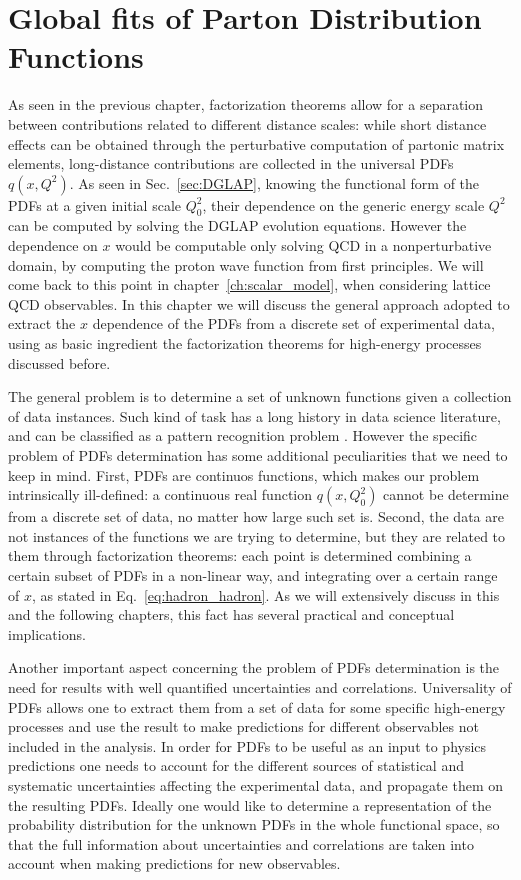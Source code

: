 \chapter{Global fits of Parton Distribution Functions} 
\label{ch:nnpdf_methodology}
As seen in the previous chapter, factorization theorems allow for a separation between contributions 
related to different distance scales: while short distance
effects can be obtained through the perturbative computation of partonic matrix elements, 
long-distance contributions are collected in the universal PDFs $q\left(x,Q^2\right)$. As seen in Sec.~\ref{sec:DGLAP},
knowing the functional form of the PDFs at a given initial scale $Q_0^2$, 
their dependence on the generic energy scale $Q^2$ can be computed by solving the DGLAP evolution equations.
However the dependence on $x$ would be computable only solving QCD in a nonperturbative domain, 
by computing the proton wave function from first principles. We will come back to 
this point in chapter~\ref{ch:scalar_model}, when considering lattice QCD observables.
In this chapter we will discuss the general approach adopted to extract the $x$ dependence of the PDFs
from a discrete set of experimental data, using as basic ingredient the factorization theorems for high-energy processes
discussed before.

%
The general problem is to determine a set of unknown functions given
a collection of data instances. Such kind of task has a long history in data science literature, 
and can be classified as a pattern recognition problem \cite{Forte:2020yip}.
However the specific problem of PDFs determination has some additional peculiarities that we need to keep in mind.
First, PDFs are continuos functions, which makes our problem intrinsically ill-defined: a continuous real function
$q\left(x,Q_0^2\right)$ cannot be determine from a discrete set of data, no matter how large such set is.
Second, the data are not instances of the functions we are trying to determine, but they are related to 
them through factorization theorems: each point is determined combining a certain subset of PDFs in a non-linear way,
and integrating over a certain range of $x$, as stated in Eq.~\eqref{eq:hadron_hadron}. 
As we will extensively discuss in this and the following chapters,
this fact has several practical and conceptual implications.

%
Another important aspect concerning the problem of PDFs determination 
is the need for results with well quantified uncertainties and correlations.
Universality of PDFs allows one to extract them from a set of data for some specific high-energy processes
and use the result to make predictions for different observables not included in the analysis.
In order for PDFs to be useful as an input to physics predictions one needs to account for the different
sources of statistical and systematic uncertainties affecting the experimental data, and
propagate them on the resulting PDFs.
Ideally one would like to determine a representation 
of the probability distribution for the unknown PDFs in the whole functional space, so that the full information
about uncertainties and correlations are taken into account when making predictions for new observables.

